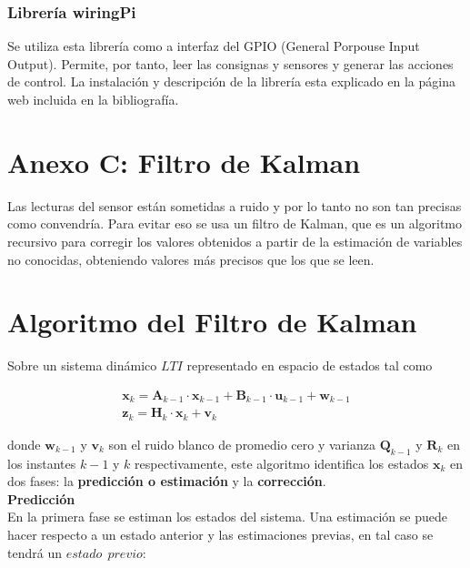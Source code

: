 \documentclass[twoside,11pt]{report}
\begin{document}
\subsubsection*{Librería wiringPi}
Se utiliza esta librería \cite{wiringPi} como a interfaz del GPIO (General Porpouse Input Output). Permite, por tanto, leer las consignas y sensores y generar las acciones de control. 
La instalación y descripción de la librería esta explicado en la página web incluida en la bibliografía.

\newpage
\section*{Anexo C: Filtro de Kalman}

Las lecturas del sensor están sometidas a ruido y por lo tanto no son tan precisas como convendría. Para evitar eso se usa un filtro de Kalman,  que es un algoritmo recursivo para corregir los valores obtenidos a partir de la estimación de variables no conocidas, obteniendo valores más precisos que los que se leen. 

\section*{Algoritmo del Filtro de Kalman}

Sobre un sistema dinámico $LTI$ representado en espacio de estados tal como

\begin{equation}
\begin{array}{l}
\mathbf{x}_{k}=\mathbf{A}_{k-1} \cdot \mathbf{x}_{k-1} + \mathbf{B}_{k-1} \cdot \mathbf{u}_{k-1} + \mathbf{w}_{k-1} \\
\mathbf{z}_{k}=\mathbf{H}_{k} \cdot \mathbf{x}_{k} + \mathbf{v}_{k}
\end{array}
\end{equation}		

donde $\mathbf{w}_{k-1}$ y $\mathbf{v}_{k}$ son el ruido blanco de promedio cero y varianza $\mathbf{Q}_{k-1}$ y $\mathbf{R}_{k}$ en los instantes $k-1$ y $k$ respectivamente, este algoritmo identifica los estados $\mathbf{x}_{k}$ en dos fases: la \textbf{predicción o estimación} y la \textbf{corrección}.  \\

\textbf{Predicción}\\

En la primera fase se estiman los estados del sistema. Una estimación se puede hacer respecto a un estado anterior y las estimaciones previas, en tal caso se tendrá un $estado \>\> previo$:
\end{document}
